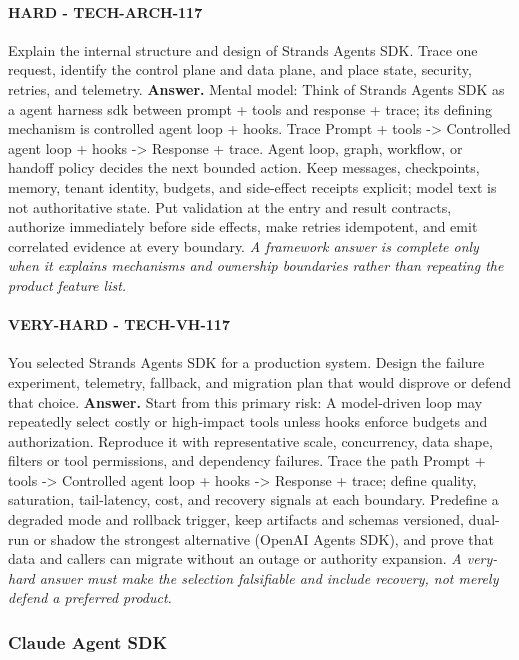 \paragraph{HARD - TECH-ARCH-117} Explain the internal structure and design of Strands Agents SDK. Trace one request, identify the control plane and data plane, and place state, security, retries, and telemetry.
\textbf{Answer.} Mental model: Think of Strands Agents SDK as a agent harness sdk between prompt + tools and response + trace; its defining mechanism is controlled agent loop + hooks. Trace Prompt + tools -> Controlled agent loop + hooks -> Response + trace. Agent loop, graph, workflow, or handoff policy decides the next bounded action. Keep messages, checkpoints, memory, tenant identity, budgets, and side-effect receipts explicit; model text is not authoritative state. Put validation at the entry and result contracts, authorize immediately before side effects, make retries idempotent, and emit correlated evidence at every boundary.
\textit{A framework answer is complete only when it explains mechanisms and ownership boundaries rather than repeating the product feature list.}
\paragraph{VERY-HARD - TECH-VH-117} You selected Strands Agents SDK for a production system. Design the failure experiment, telemetry, fallback, and migration plan that would disprove or defend that choice.
\textbf{Answer.} Start from this primary risk: A model-driven loop may repeatedly select costly or high-impact tools unless hooks enforce budgets and authorization. Reproduce it with representative scale, concurrency, data shape, filters or tool permissions, and dependency failures. Trace the path Prompt + tools -> Controlled agent loop + hooks -> Response + trace; define quality, saturation, tail-latency, cost, and recovery signals at each boundary. Predefine a degraded mode and rollback trigger, keep artifacts and schemas versioned, dual-run or shadow the strongest alternative (OpenAI Agents SDK), and prove that data and callers can migrate without an outage or authority expansion.
\textit{A very-hard answer must make the selection falsifiable and include recovery, not merely defend a preferred product.}
\subsubsection*{Claude Agent SDK}
